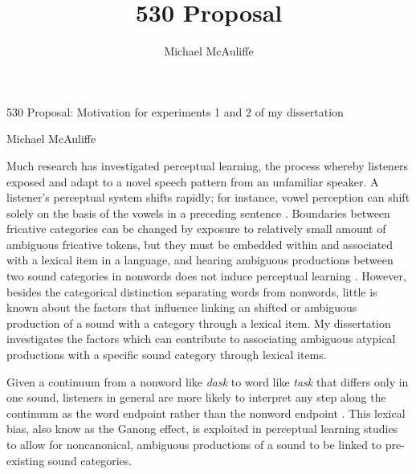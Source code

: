 \documentclass[11pt]{article} %
\title{530 Proposal}
\author{Michael McAuliffe}
\date{} %
\begin{document}
\begin{center}
530 Proposal: Motivation for experiments 1 and 2 of my dissertation

Michael McAuliffe
\end{center}

Much research has investigated perceptual learning, the process whereby listeners exposed and adapt to a novel speech pattern from an unfamiliar speaker.  A listener's perceptual system shifts rapidly; for instance, vowel perception can shift solely on the basis of the vowels in a  preceding sentence \citep{Ladefoged1957}.  Boundaries between fricative categories can be changed by exposure to relatively small amount of ambiguous fricative tokens, but they must be embedded within and associated with a lexical item in a language, and hearing ambiguous productions between two sound categories in nonwords does not induce perceptual learning \citep{Norris2003}. However, besides the categorical distinction separating words from nonwords, little is known about the factors that influence linking an shifted or ambiguous production of a sound with a category through a lexical item. My dissertation investigates the factors which can contribute to associating ambiguous atypical productions with a specific sound category through lexical items. 

Given a continuum from a nonword like \emph{dask} to word like \emph{task} that differs only in one sound, listeners in general are more likely to interpret any step along the continuum as the word endpoint rather than the nonword endpoint \citep{Ganong1980}. This lexical bias, also know as the Ganong effect, is exploited in perceptual learning studies to allow for noncanonical, ambiguous productions of a sound to be linked to pre-existing sound categories.
\end{document}

